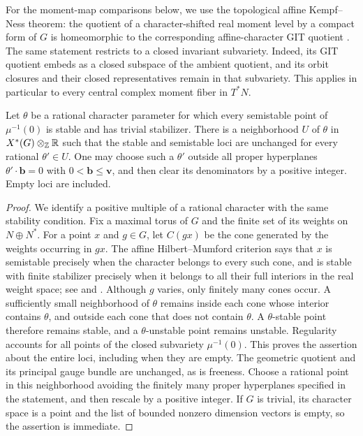 For the moment-map comparisons below, we use the topological affine
Kempf--Ness theorem: the quotient of a character-shifted real moment
level by a compact form of $G$ is homeomorphic to the corresponding
affine-character GIT quotient
\cite[Theorem~4.2(v)]{Hoskins14}.  The same statement restricts to a closed
invariant subvariety.  Indeed, its GIT quotient embeds as a closed
subspace of the ambient quotient, and its orbit closures and their
closed representatives remain in that subvariety.  This applies in
particular to every central complex moment fiber in $T^*N$.

\begin{lemma}\label{lem:local-stability}
Let $\theta$ be a rational character parameter for which every semistable
point of $\mu^{-1}(0)$ is stable and has trivial stabilizer.  There is a
neighborhood $U$ of $\theta$ in $X^*(G)\otimes_{\mathbb Z}\mathbb R$ such that
the stable and semistable loci are unchanged for every rational
$\theta'\in U$.  One may choose such a $\theta'$ outside all proper
hyperplanes $\theta'\cdot\mathbf b=0$ with $0<\mathbf b\leq\mathbf v$,
and then clear its denominators by a positive integer.  Empty loci are included.
\end{lemma}

\begin{proof}
We identify a positive multiple of a rational character with the same
stability condition.  Fix a maximal torus of $G$ and the finite set of its
weights on $N\oplus N^*$.  For a point $x$ and $g\in G$, let $C(gx)$ be the
cone generated by the weights occurring in $gx$.  The affine
Hilbert--Mumford criterion says that $x$ is semistable precisely when the
character belongs to every such cone, and is stable with finite stabilizer
precisely when it belongs to all their full interiors in the real weight
space; see \cite{King94} and
\cite[Propositions~2.5 and 2.7]{Hoskins14}.
Although $g$ varies, only finitely many cones
occur.  A sufficiently small neighborhood of $\theta$ remains inside each
cone whose interior contains $\theta$, and outside each cone that does not
contain $\theta$.  A $\theta$-stable point therefore remains stable, and a
$\theta$-unstable point remains unstable.  Regularity accounts for all
points of the closed subvariety $\mu^{-1}(0)$.  This proves the assertion
about the entire loci, including when they are empty.  The geometric
quotient and its principal gauge bundle are unchanged, as is freeness.
Choose a rational point in this neighborhood avoiding the finitely many
proper hyperplanes specified in the statement, and then rescale by a
positive integer.  If $G$ is trivial, its character space is a point and
the list of bounded nonzero dimension vectors is empty, so the assertion
is immediate.
\end{proof}


